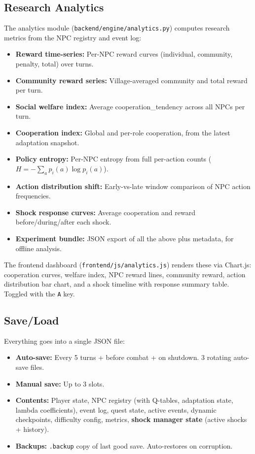 \subsection{Research Analytics}

The analytics module (\texttt{backend/engine/analytics.py}) computes research metrics from the NPC registry and event log:

\begin{itemize}
    \item \textbf{Reward time-series:} Per-NPC reward curves (individual, community, penalty, total) over turns.
    \item \textbf{Community reward series:} Village-averaged community and total reward per turn.
    \item \textbf{Social welfare index:} Average cooperation\_tendency across all NPCs per turn.
    \item \textbf{Cooperation index:} Global and per-role cooperation, from the latest adaptation snapshot.
    \item \textbf{Policy entropy:} Per-NPC entropy from full per-action counts ($H = -\sum_{a} p_i(a) \log p_i(a)$).
    \item \textbf{Action distribution shift:} Early-vs-late window comparison of NPC action frequencies.
    \item \textbf{Shock response curves:} Average cooperation and reward before/during/after each shock.
    \item \textbf{Experiment bundle:} JSON export of all the above plus metadata, for offline analysis.
\end{itemize}

The frontend dashboard (\texttt{frontend/js/analytics.js}) renders these via Chart.js: cooperation curves, welfare index, NPC reward lines, community reward, action distribution bar chart, and a shock timeline with response summary table. Toggled with the \texttt{A} key.

\subsection{Save/Load}

Everything goes into a single JSON file:
\begin{itemize}
    \item \textbf{Auto-save:} Every 5 turns + before combat + on shutdown. 3 rotating auto-save files.
    \item \textbf{Manual save:} Up to 3 slots.
    \item \textbf{Contents:} Player state, NPC registry (with Q-tables, adaptation state, lambda coefficients), event log, quest state, active events, dynamic checkpoints, difficulty config, metrics, \textbf{shock manager state} (active shocks + history).
    \item \textbf{Backups:} \texttt{.backup} copy of last good save. Auto-restores on corruption.
\end{itemize}

